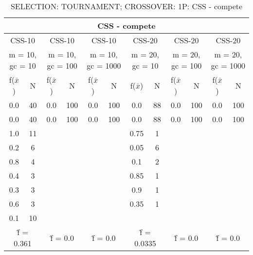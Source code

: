 \begin{table}[H]
	\centering
	\caption{SELECTION: TOURNAMENT; CROSSOVER: 1P: CSS - compete}
	\begin{adjustbox}{width=1\textwidth}
		\begin{tabular}{ |c|c||c|c||c|c||c|c||c|c||c|c| }
			\hline
			\multicolumn{12}{|c|}{CSS - compete} \\
			\hline
			\multicolumn{2}{|c||}{CSS-10} & \multicolumn{2}{c||}{CSS-10} & \multicolumn{2}{c||}{CSS-10} & \multicolumn{2}{c||}{CSS-20} & \multicolumn{2}{c||}{CSS-20} & \multicolumn{2}{c|}{CSS-20}\\
			\hline
			\multicolumn{2}{|c||}{m = 10, gc = 10} & \multicolumn{2}{c||}{m = 10, gc = 100} & \multicolumn{2}{c||}{m = 10, gc = 1000} & \multicolumn{2}{c||}{m = 20, gc = 10} & \multicolumn{2}{c||}{m = 20, gc = 100} & \multicolumn{2}{c|}{m = 20, gc = 1000}\\
			\hline
			f($\bar{x}$) & N & f($\bar{x}$) & N & f($\bar{x}$) & N & f($\bar{x}$) & N & f($\bar{x}$) & N & f($\bar{x}$) & N\\
			\hline
			\hline
			0.0 & 40 & 0.0 & 100 & 0.0 & 100 & 0.0 & 88 & 0.0 & 100 & 0.0 & 100\\
			\hline
			0.0 & 40 & 0.0 & 100 & 0.0 & 100 & 0.0 & 88 & 0.0 & 100 & 0.0 & 100\\
			1.0 & 11 &   &   &   &   & 0.75 & 1 &   &   &   &  \\
			0.2 & 6 &   &   &   &   & 0.05 & 6 &   &   &   &  \\
			0.8 & 4 &   &   &   &   & 0.1 & 2 &   &   &   &  \\
			0.4 & 3 &   &   &   &   & 0.85 & 1 &   &   &   &  \\
			0.3 & 3 &   &   &   &   & 0.9 & 1 &   &   &   &  \\
			0.6 & 3 &   &   &   &   & 0.35 & 1 &   &   &   &  \\
			0.1 & 10 &   &   &   &   &   &   &   &   &   &  \\
			\hline
			\multicolumn{2}{|c||}{\^{f} = 0.361} & \multicolumn{2}{c||}{\^{f} = 0.0} & \multicolumn{2}{c||}{\^{f} = 0.0} & \multicolumn{2}{c||}{\^{f} = 0.0335} & \multicolumn{2}{c||}{\^{f} = 0.0} & \multicolumn{2}{c|}{\^{f} = 0.0}\\
			\hline
		\end{tabular}
	\end{adjustbox}
\end{table}
